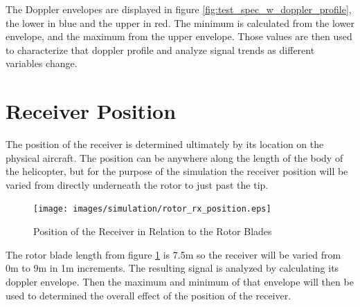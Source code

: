 The Doppler envelopes are displayed in figure \ref{fig:test_spec_w_doppler_profile}, the lower in blue and the upper in red. The minimum is calculated from the lower envelope, and the maximum from the upper envelope. Those values are then used to characterize that doppler profile and analyze signal trends as different variables change.

\section{Receiver Position}
The position of the receiver is determined ultimately by its location on the physical aircraft. The position can be anywhere along the length of the body of the helicopter, but for the purpose of the simulation the receiver position will be varied from directly underneath the rotor to just past the tip. 

\begin{figure}
	\begin{center}
		\texttt{[image: images/simulation/rotor\_rx\_position.eps]}
		\caption{Position of the Receiver in Relation to the Rotor Blades}
		\label{fig:rx_position_image}
	\end{center}
\end{figure}

The rotor blade length from figure \ref{fig:rx_position_image} is 7.5m so the receiver will be varied from 0m to 9m in 1m increments. The resulting signal is analyzed by calculating its doppler envelope. Then the maximum and minimum of that envelope will then be used to determined the overall effect of the position of the receiver.

